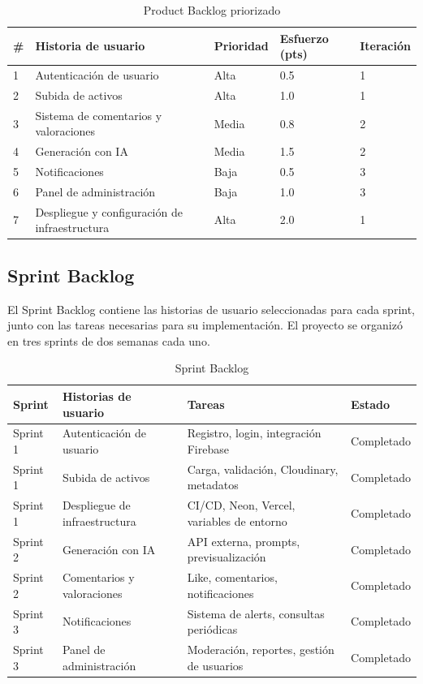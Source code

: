\begin{table}[H]
\centering
\caption{Product Backlog priorizado}
\label{tab:product_backlog}
\begin{tabular}{p{0.5cm}p{4.5cm}p{1.8cm}p{1.8cm}p{1.8cm}}
\hline
\# & Historia de usuario & Prioridad & Esfuerzo (pts) & Iteración \\
\hline
1 & Autenticación de usuario & Alta & 0.5 & 1 \\
2 & Subida de activos & Alta & 1.0 & 1 \\
3 & Sistema de comentarios y valoraciones & Media & 0.8 & 2 \\
4 & Generación con IA & Media & 1.5 & 2 \\
5 & Notificaciones & Baja & 0.5 & 3 \\
6 & Panel de administración & Baja & 1.0 & 3 \\
7 & Despliegue y configuración de infraestructura & Alta & 2.0 & 1 \\
\hline
\end{tabular}
\end{table}

\subsection{Sprint Backlog}

El Sprint Backlog contiene las historias de usuario seleccionadas para cada sprint, junto con las tareas necesarias para su implementación. El proyecto se organizó en tres sprints de dos semanas cada uno.

\begin{table}[H]
\centering
\caption{Sprint Backlog}
\label{tab:sprint_backlog}
\begin{tabular}{p{1.5cm}p{4cm}p{2.5cm}p{2.5cm}}
\hline
Sprint & Historias de usuario & Tareas & Estado \\
\hline
Sprint 1 & Autenticación de usuario & Registro, login, integración Firebase & Completado \\
Sprint 1 & Subida de activos & Carga, validación, Cloudinary, metadatos & Completado \\
Sprint 1 & Despliegue de infraestructura & CI/CD, Neon, Vercel, variables de entorno & Completado \\
Sprint 2 & Generación con IA & API externa, prompts, previsualización & Completado \\
Sprint 2 & Comentarios y valoraciones & Like, comentarios, notificaciones & Completado \\
Sprint 3 & Notificaciones & Sistema de alerts, consultas periódicas & Completado \\
Sprint 3 & Panel de administración & Moderación, reportes, gestión de usuarios & Completado \\
\hline
\end{tabular}
\end{table}

